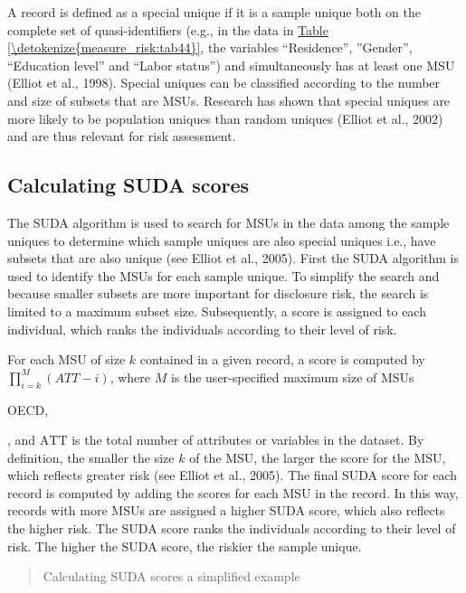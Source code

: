 \documentclass[letterpaper,10pt,english]{sphinxmanual}
\begin{document}
A record is defined as a special unique if it is a sample unique both on
the complete set of quasi-identifiers (e.g., in the data in \hyperref[\detokenize{measure_risk:tab44}]{Table \ref{\detokenize{measure_risk:tab44}}},
the variables “Residence”, ”Gender”, “Education level” and “Labor
status”) and simultaneously has at least one MSU (Elliot et al., 1998).
Special uniques can be classified according to the number and size of
subsets that are MSUs. Research has shown that special uniques are more
likely to be population uniques than random uniques (Elliot et al.,
2002) and are thus relevant for risk assessment.


\subsection{Calculating SUDA scores}
\label{\detokenize{measure_risk:calculating-suda-scores}}
The SUDA algorithm is used to search for MSUs in the data among the
sample uniques to determine which sample uniques are also special
uniques i.e., have subsets that are also unique (see Elliot et al.,
2005). First the SUDA algorithm is used to identify the MSUs for each
sample unique. To simplify the search and because smaller subsets are
more important for disclosure risk, the search is limited to a maximum
subset size. Subsequently, a score is assigned to each individual, which
ranks the individuals according to their level of risk.

For each MSU of size \(k\) contained in a given record, a score is
computed by \(\prod_{i = k}^{M}{(ATT - i)}\), where \(M\) is the
user-specified maximum size of MSUs %
\begin{footnote}[12]\sphinxAtStartFootnote
OECD, 
%
\end{footnote}, and
\(\text{ATT}\) is the total number of attributes or variables in the
dataset. By definition, the smaller the size \(k\) of the MSU, the
larger the score for the MSU, which reflects greater risk (see Elliot et
al., 2005). The final SUDA score for each record is computed by adding
the scores for each MSU in the record. In this way, records with more
MSUs are assigned a higher SUDA score, which also reflects the higher
risk. The SUDA score ranks the individuals according to their level of
risk. The higher the SUDA score, the riskier the sample unique.
\begin{quote}

Calculating SUDA scores \textendash{} a simplified example
\end{quote}
\end{document}
